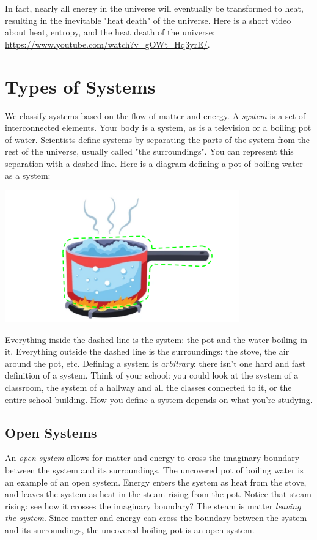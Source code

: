 In fact, nearly all energy in the universe will eventually be transformed to heat,
resulting in the inevitable "heat death" of the universe. Here is a short video 
about heat, entropy, and the heat death of the universe: 
\url{https://www.youtube.com/watch?v=gOWt_Hq3yrE/}. 

\section{Types of Systems}
We classify systems based on the flow of matter and energy. A \textit{system} is 
a set of interconnected elements. Your body is a system, as is a television or a 
boiling pot of water. Scientists define systems by separating the parts of the 
system from the rest of the universe, usually called "the surroundings". You can 
represent this separation with a dashed line. Here is a diagram defining a pot of
boiling water as a system:

\begin{center}
\includegraphics[width=4in]{pot_open_system.png}
\end{center}

Everything inside the dashed line is the system: the pot and the water boiling in
it. Everything outside the dashed line is the surroundings: the stove, the air 
around the pot, etc. Defining a system is \textit{arbitrary}: there isn't one hard 
and fast definition of a system. Think of your school: you could look at the 
system of a classroom, the system of a hallway and all the classes connected to 
it, or the entire school building. How you define a system depends on what you're 
studying. 

\subsection{Open Systems}
An \textit{open system} allows for matter and energy to cross the imaginary 
boundary between the system and its surroundings. The uncovered pot of boiling 
water is an example of an open system. Energy enters the system as heat from the
stove, and leaves the system as heat in the steam rising from the pot. Notice 
that steam rising: see how it crosses the imaginary boundary? The steam is matter 
\textit{leaving the system}. Since matter and energy can cross the boundary 
between the system and its surroundings, the uncovered boiling pot is an open 
system. 

